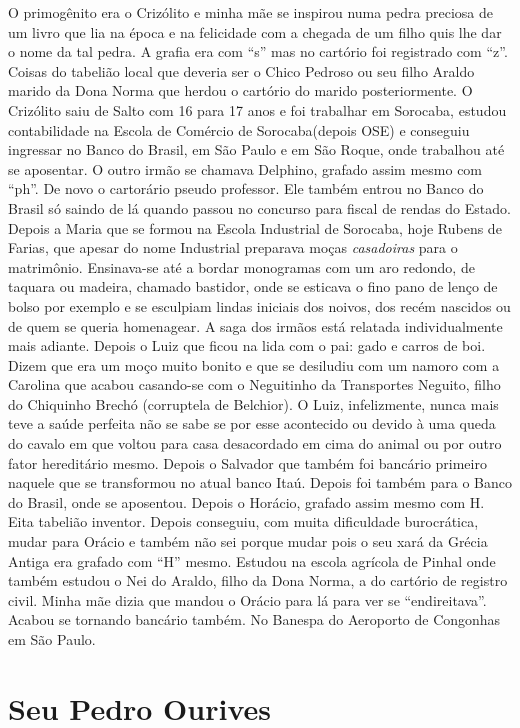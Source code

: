 \documentclass[12pt,brazil,]{book}
\begin{document}
O primogênito era o Crizólito e minha mãe se inspirou numa pedra
preciosa de um livro que lia na época e na felicidade com a chegada de
um filho quis lhe dar o nome da tal pedra. A grafia era com ``s'' mas no
cartório foi registrado com ``z''. Coisas do tabelião local que deveria
ser o Chico Pedroso ou seu filho Araldo marido da Dona Norma que herdou
o cartório do marido posteriormente. O Crizólito saiu de Salto com 16
para 17 anos e foi trabalhar em Sorocaba, estudou contabilidade na
Escola de Comércio de Sorocaba(depois OSE) e conseguiu ingressar no
Banco do Brasil, em São Paulo e em São Roque, onde trabalhou até se
aposentar. O outro irmão se chamava Delphino, grafado assim mesmo com
``ph''. De novo o cartorário pseudo professor. Ele também entrou no
Banco do Brasil só saindo de lá quando passou no concurso para fiscal de
rendas do Estado. Depois a Maria que se formou na Escola Industrial de
Sorocaba, hoje Rubens de Farias, que apesar do nome Industrial preparava
moças \emph{casadoiras} para o matrimônio. Ensinava-se até a bordar
monogramas com um aro redondo, de taquara ou madeira, chamado bastidor,
onde se esticava o fino pano de lenço de bolso por exemplo e se
esculpiam lindas iniciais dos noivos, dos recém nascidos ou de quem se
queria homenagear. A saga dos irmãos está relatada individualmente mais
adiante. Depois o Luiz que ficou na lida com o pai: gado e carros de
boi. Dizem que era um moço muito bonito e que se desiludiu com um namoro
com a Carolina que acabou casando-se com o Neguitinho da Transportes
Neguito, filho do Chiquinho Brechó (corruptela de Belchior). O Luiz,
infelizmente, nunca mais teve a saúde perfeita não se sabe se por esse
acontecido ou devido à uma queda do cavalo em que voltou para casa
desacordado em cima do animal ou por outro fator hereditário mesmo.
Depois o Salvador que também foi bancário primeiro naquele que se
transformou no atual banco Itaú. Depois foi também para o Banco do
Brasil, onde se aposentou. Depois o Horácio, grafado assim mesmo com H.
Eita tabelião inventor. Depois conseguiu, com muita dificuldade
burocrática, mudar para Orácio e também não sei porque mudar pois o seu
xará da Grécia Antiga era grafado com ``H'' mesmo. Estudou na escola
agrícola de Pinhal onde também estudou o Nei do Araldo, filho da Dona
Norma, a do cartório de registro civil. Minha mãe dizia que mandou o
Orácio para lá para ver se ``endireitava''. Acabou se tornando bancário
também. No Banespa do Aeroporto de Congonhas em São Paulo.

\section{Seu Pedro Ourives}\label{seu-pedro-ourives}
\end{document}
